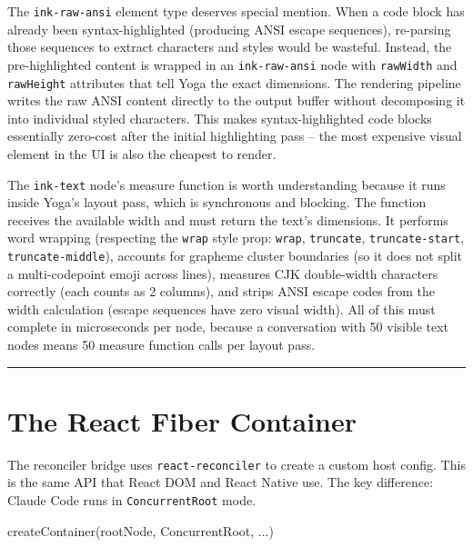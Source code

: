 \documentclass[
  english,
  11pt,
  letterpaper,
]{book}
\newenvironment{Shaded}{\begin{snugshade}}{\end{snugshade}}
\newcommand{\FunctionTok}[1]{\textcolor[rgb]{0.28,0.35,0.67}{#1}}
\newcommand{\NormalTok}[1]{\textcolor[rgb]{0.00,0.23,0.31}{#1}}
\newcommand{\OperatorTok}[1]{\textcolor[rgb]{0.37,0.37,0.37}{#1}}
\begin{document}
The \texttt{ink-raw-ansi} element type deserves special mention. When a
code block has already been syntax-highlighted (producing ANSI escape
sequences), re-parsing those sequences to extract characters and styles
would be wasteful. Instead, the pre-highlighted content is wrapped in an
\texttt{ink-raw-ansi} node with \texttt{rawWidth} and \texttt{rawHeight}
attributes that tell Yoga the exact dimensions. The rendering pipeline
writes the raw ANSI content directly to the output buffer without
decomposing it into individual styled characters. This makes
syntax-highlighted code blocks essentially zero-cost after the initial
highlighting pass -- the most expensive visual element in the UI is also
the cheapest to render.

The \texttt{ink-text} node's measure function is worth understanding
because it runs inside Yoga's layout pass, which is synchronous and
blocking. The function receives the available width and must return the
text's dimensions. It performs word wrapping (respecting the
\texttt{wrap} style prop: \texttt{wrap}, \texttt{truncate},
\texttt{truncate-start}, \texttt{truncate-middle}), accounts for
grapheme cluster boundaries (so it does not split a multi-codepoint
emoji across lines), measures CJK double-width characters correctly
(each counts as 2 columns), and strips ANSI escape codes from the width
calculation (escape sequences have zero visual width). All of this must
complete in microseconds per node, because a conversation with 50
visible text nodes means 50 measure function calls per layout pass.

\begin{center}\rule{0.5\linewidth}{0.5pt}\end{center}

\section{The React Fiber Container}\label{the-react-fiber-container}

The reconciler bridge uses \texttt{react-reconciler} to create a custom
host config. This is the same API that React DOM and React Native use.
The key difference: Claude Code runs in \texttt{ConcurrentRoot} mode.

\begin{Shaded}
\begin{Highlighting}[]
\FunctionTok{createContainer}\NormalTok{(rootNode}\OperatorTok{,}\NormalTok{ ConcurrentRoot}\OperatorTok{,} \OperatorTok{...}\NormalTok{)}
\end{Highlighting}
\end{Shaded}
\end{document}
